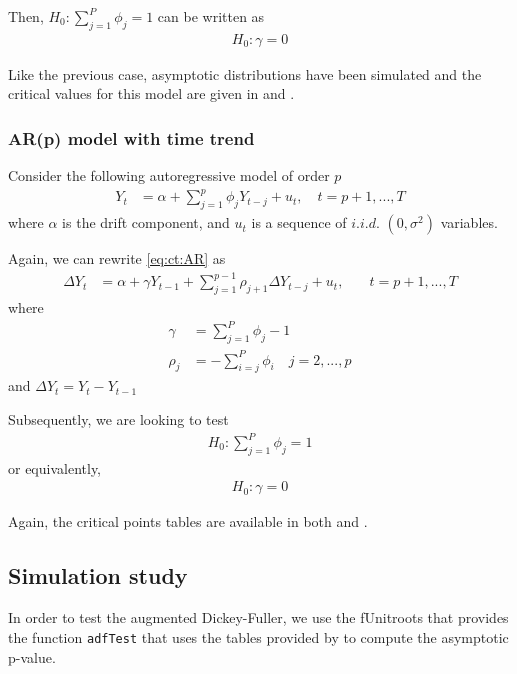 \documentclass[]{article}\usepackage[]{graphicx}\usepackage[]{color}
\newcommand{\pkg}[1]{{\normalfont\fontseries{b}\selectfont #1}}
\let\code=\texttt
\begin{document}
Then, $H_0: \sum_{j=1}^{P} \phi_{j}=1$ can be written as
\begin{align}
	H_0: \gamma=0
\end{align}

Like the previous case, asymptotic distributions have been simulated and the critical values for this model are given in \cite{banerjee_co-integration_1993} and \cite[Table 8.5.2]{fuller_introduction_1976}.

\subsubsection{AR(p) model with time trend}

Consider the following autoregressive model of order $p$
\begin{align}
	\label{eq:ct:AR}
	Y_t & = \alpha + \sum_{j=1}^{p} \phi_j Y_{t-j} + u_t, \quad t = p + 1, ... , T
\end{align}
where $\alpha$ is the drift component, and $u_t$ is a sequence of $i.i.d.$ $(0,\sigma^2)$ variables.

Again, we can rewrite \ref{eq:ct:AR} as
\begin{align}
	\Delta Y_t & =  \alpha + \gamma Y_{t-1} + \sum_{j=1}^{p-1}\rho_{j+1}\Delta Y_{t-j} + u_t, & \quad t = p + 1, ... , T
\end{align}
where
\begin{align}
	\gamma & =\sum_{j=1}^{P} \phi_{j} -1 \\
	\rho_j & = - \sum_{i=j}^{P} \phi_{i} \quad j = 2,...,p
\end{align}
and $\Delta Y_t= Y_{t}-Y_{t-1}$

Subsequently, we are looking to test
\begin{align}
	H_0: \sum_{j=1}^{P} \phi_{j} = 1
\end{align}
or equivalently,
\begin{align}
	H_0: \gamma=0
\end{align}

Again, the critical points tables are available in both \cite{banerjee_co-integration_1993} and \cite[Table 8.5.2]{fuller_introduction_1976}.


\subsection{Simulation study}

In order to test the augmented Dickey-Fuller, we use the \pkg{fUnitroots} \citep{wuertz_funitroots:_2013} that provides the function \code{adfTest} that uses the tables provided by \cite{banerjee_co-integration_1993} to compute the asymptotic p-value.
\end{document}
